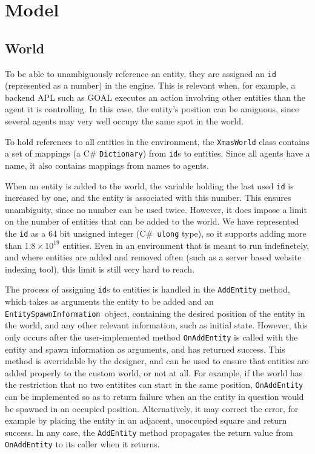 
\section{Model}


\subsection{World}

To be able to unambiguously reference an entity, they are assigned
an \texttt{id} (represented as a number) in the engine. This is relevant
when, for example, a backend APL such as GOAL executes an action involving
other entities than the agent it is controlling. In this case, the
entity's position can be amiguous, since several agents may very well
occupy the same spot in the world.

To hold references to all entities in the environment, the \texttt{XmasWorld}
class contains a set of mappings (a C\# \texttt{Dictionary}) from
\texttt{id}s to entities. Since all agents have a name, it also contains
mappings from names to agents. 

When an entity is added to the world, the variable holding the last
used \texttt{id} is increased by one, and the entity is associated
with this number. This ensures unambiguity, since no number can be
used twice. However, it does impose a limit on the number of entities
that can be added to the world. We have represented the \texttt{id}
as a 64 bit unsigned integer (C\#\texttt{ ulong} type), so it supports
adding more than $1.8\times10^{19}$ entities. Even in an environment
that is meant to run indefinetely, and where entities are added and
removed often (such as a server based website indexing tool), this
limit is still very hard to reach. 

The process of assigning \texttt{id}s to entities is handled in the
\texttt{AddEntity} method, which takes as arguments the entity to
be added and an \texttt{EntitySpawnInformation }object, containing
the desired position of the entity in the world, and any other relevant
information, such as initial state. However, this only occurs after
the user-implemented method \texttt{OnAddEntity} is called with the
entity and spawn information as arguments, and has returned success.
This method is overridable by the designer, and can be used to ensure
that entities are added properly to the custom world, or not at all.
For example, if the world has the restriction that no two entitites
can start in the same position, \texttt{OnAddEntity} can be implemented
so as to return failure when an the entity in question would be spawned
in an occupied position. Alternatively, it may correct the error,
for example by placing the entity in an adjacent, unoccupied square
and return success. In any case, the \texttt{AddEntity} method propagates
the return value from \texttt{OnAddEntity} to its caller when it returns.

